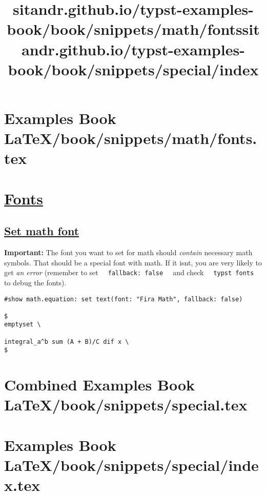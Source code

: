 \pandocbounded{}


\section{Examples Book LaTeX/book/snippets/math/fonts.tex}
\title{sitandr.github.io/typst-examples-book/book/snippets/math/fonts}

\section{\texorpdfstring{\hyperref[fonts]{Fonts}}{Fonts}}\label{fonts}

\subsection{\texorpdfstring{\hyperref[set-math-font]{Set math
font}}{Set math font}}\label{set-math-font}

\textbf{Important:} The font you want to set for math should
\emph{contain} necessary math symbols. That should be a special font
with math. If it isn\textquotesingle t, you are very likely to get
\emph{an error} (remember to set
\texttt{\ }{\texttt{\ fallback:\ false\ }}\texttt{\ } and check
\texttt{\ }{\texttt{\ typst\ fonts\ }}\texttt{\ } to debug the fonts).

\begin{verbatim}
#show math.equation: set text(font: "Fira Math", fallback: false)

$
emptyset \

integral_a^b sum (A + B)/C dif x \
$
\end{verbatim}

\pandocbounded{}




\section{Combined Examples Book LaTeX/book/snippets/special.tex}
\section{Examples Book LaTeX/book/snippets/special/index.tex}
\title{sitandr.github.io/typst-examples-book/book/snippets/special/index}

